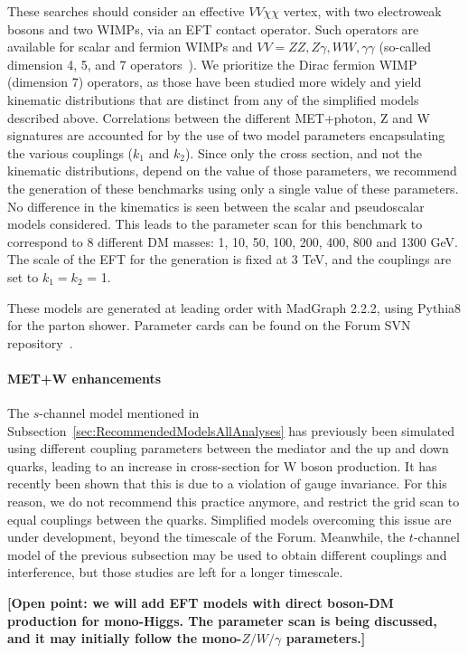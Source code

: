 \documentclass[a4,debug,notitlepage,nobib]{tufte-handout}
\begin{document}
These searches should consider an
effective $VV\chi\chi$ vertex, with two electroweak bosons and two WIMPs,
via an EFT contact operator. Such operators are available for scalar
and fermion WIMPs and $VV=ZZ,Z \gamma,WW,\gamma \gamma$ (so-called
dimension 4, 5, and 7 operators~\cite{Carpenter:2012rg,
Crivellin:2015wva}). We prioritize the Dirac fermion WIMP (dimension
7) operators, as those have been studied more widely and yield
kinematic distributions that are distinct from any of the simplified
models described above.  Correlations between the different
MET+photon, Z and W signatures are accounted for by the use of two
model parameters encapsulating the various couplings ($k_1$ and $k_2$). 
Since only the cross section, and not the kinematic
distributions, depend on the value of those parameters, we recommend
the generation of these benchmarks using only a single value of these
parameters. No difference in the kinematics is seen between the scalar
and pseudoscalar models considered.  This leads to the parameter scan
for this benchmark to correspond to 8 different DM masses: 
1, 10, 50, 100, 200, 400, 800 and 1300 GeV. The scale of the EFT
for the generation is fixed at 3 TeV, and the couplings are
set to $k_1 = k_2$ = 1. 

These models are generated at leading
order with MadGraph 2.2.2, using Pythia8 for the parton shower.
Parameter cards can be found on the Forum SVN repository~\cite{ForumSVN_EWEFTD7}.

\paragraph{MET+W enhancements} The $s$-channel model mentioned in
Subsection~\ref{sec:RecommendedModelsAllAnalyses} has previously been
simulated using different coupling parameters between the mediator and
the up and down quarks, leading to an increase in cross-section for W
boson production. It has recently been shown \cite{Bell:2015sza} that
this is due to a violation of gauge invariance. For this reason, we do
not recommend this practice anymore, and restrict the grid scan to
equal couplings between the quarks. Simplified models overcoming this
issue are under development, beyond the timescale of the Forum.
Meanwhile, the $t$-channel model of the previous subsection may be
used to obtain different couplings and interference, but those studies
are left for a longer timescale.


\textbf{[Open point: we will add EFT models with direct boson-DM production 
for mono-Higgs. The parameter scan is being discussed, and 
it may initially follow the mono-$Z/W/\gamma$ parameters.]}
\end{document}
